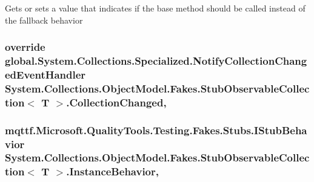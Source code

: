 Gets or sets a value that indicates if the base method should be called instead of the fallback behavior

\hypertarget{class_system_1_1_collections_1_1_object_model_1_1_fakes_1_1_stub_observable_collection_3_01_t_01_4_a387157f86053dc42fa70e43492802296}{
\subsubsection[{Collection\-Changed}]{\setlength{\rightskip}{0pt plus 5cm}override global.\-System.\-Collections.\-Specialized.\-Notify\-Collection\-Changed\-Event\-Handler System.\-Collections.\-Object\-Model.\-Fakes.\-Stub\-Observable\-Collection$<$ T $>$.Collection\-Changed\hspace{0.3cm}{\ttfamily [add]}, {\ttfamily [remove]}}}\label{class_system_1_1_collections_1_1_object_model_1_1_fakes_1_1_stub_observable_collection_3_01_t_01_4_a387157f86053dc42fa70e43492802296}
\hypertarget{class_system_1_1_collections_1_1_object_model_1_1_fakes_1_1_stub_observable_collection_3_01_t_01_4_aae4ac23e2187cae1dfe0f913ec680139}{
\subsubsection[{Instance\-Behavior}]{\setlength{\rightskip}{0pt plus 5cm}mqttf.\-Microsoft.\-Quality\-Tools.\-Testing.\-Fakes.\-Stubs.\-I\-Stub\-Behavior System.\-Collections.\-Object\-Model.\-Fakes.\-Stub\-Observable\-Collection$<$ T $>$.Instance\-Behavior\hspace{0.3cm}{\ttfamily [get]}, {\ttfamily [set]}}}\label{class_system_1_1_collections_1_1_object_model_1_1_fakes_1_1_stub_observable_collection_3_01_t_01_4_aae4ac23e2187cae1dfe0f913ec680139}


